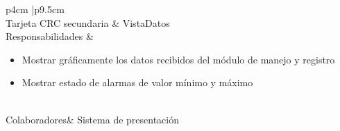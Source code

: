 		\begin{table}[h]
		\centering
		\begin{tabular}{ p{4cm} |p{9.5cm} }
		\hline
		 \\
		\hline
		Tarjeta CRC secundaria & VistaDatos\\
		\hline
		Responsabilidades & \begin{itemize}
								\item Mostrar gráficamente los datos recibidos del módulo de manejo y registro
								\item Mostrar estado de alarmas de valor mínimo y máximo
								 \end{itemize} \\
		\hline
		Colaboradores& Sistema de presentación \\
		\hline
		\end{tabular}
		\caption{Tarjeta CRC secundaria VistaDatos}
		\end{table}


